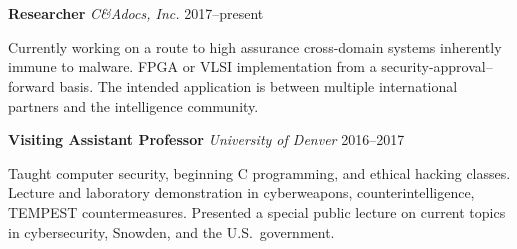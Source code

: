 \section*{}

\begin{comment}
\vspace{-10mm}
\emph{Technical programming, cybersecurity, certification and accreditation
of cross domain solutions and systems, cryptography, pentesting, security
research, writing and speaking. Specialist in understanding new government
computer security standards---especially when they're new or have
suddenly changed. Experienced in Common Criteria, DIACAP, NIST SP 800-53
and RMF, DCID 6/3, and DoD 8540.}
\end{comment}

\vspace{-10mm}
\begin{comment}
\noindent\textbf{Research Assistant Professor}
    \hfill\emph{University of Denver}\hfill 2017--present

    \vspace{1mm}
    \noindent Developing a transformational new method for high assurance cross-domain
    information transfer. FPGA implementation from a
    security-approval--forward basis. The intended application is
    between multiple international partners and intel community.
    Principal Investigator (PI) for the CCM project.

\vspace{3mm}
\end{comment}
\noindent\textbf{Researcher}
    \hfill\emph{C\&Adocs, Inc.} \hfill 2017--present

    \vspace{1mm}
    \noindent 
    Currently working on a route to high assurance cross-domain systems
    inherently immune to malware. FPGA or VLSI implementation from a
    security-approval--forward basis. The intended application is between
    multiple international partners and the intelligence community.

\vspace{3mm}
\noindent\textbf{Visiting Assistant Professor}
    \hfill \emph{University of Denver} \hfill 2016--2017

    \vspace{1mm}
    \noindent Taught computer security, beginning C programming, and ethical hacking
    classes. Lecture and laboratory demonstration in cyberweapons,
    counterintelligence, TEMPEST countermeasures. Presented a special public lecture on
    current topics in cybersecurity, Snowden, and the U.S.\ government.


